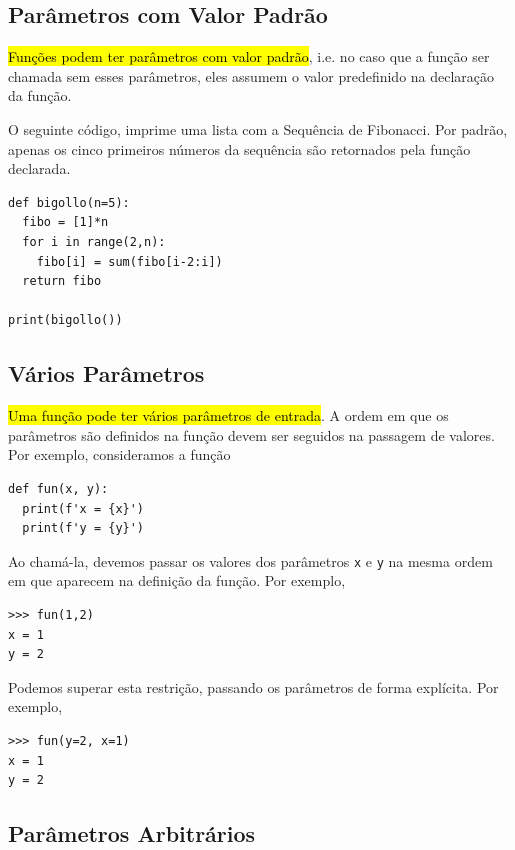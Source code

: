 \subsection{Parâmetros com Valor Padrão}

\hl{Funções podem ter parâmetros com valor padrão}, i.e. no caso que a função ser chamada sem esses parâmetros, eles assumem o valor predefinido na declaração da função.

\begin{ex}
  O seguinte código, imprime uma lista com a Sequência de Fibonacci{\fibonacci}. Por padrão, apenas os cinco primeiros números da sequência são retornados pela função declarada.

\begin{lstlisting}
def bigollo(n=5):
  fibo = [1]*n
  for i in range(2,n):
    fibo[i] = sum(fibo[i-2:i])
  return fibo

print(bigollo())
\end{lstlisting}

\end{ex}

\subsection{Vários Parâmetros}

\hl{Uma função pode ter vários parâmetros de entrada}. A ordem em que os parâmetros são definidos na função devem ser seguidos na passagem de valores. Por exemplo, consideramos a função

\begin{lstlisting}
def fun(x, y):
  print(f'x = {x}')
  print(f'y = {y}')
\end{lstlisting}

Ao chamá-la, devemos passar os valores dos parâmetros \lstinline+x+ e \lstinline+y+ na mesma ordem em que aparecem na definição da função. Por exemplo,

\begin{lstlisting}
>>> fun(1,2)
x = 1
y = 2
\end{lstlisting}

Podemos superar esta restrição, passando os parâmetros de forma explícita. Por exemplo,

\begin{lstlisting}
>>> fun(y=2, x=1)
x = 1
y = 2
\end{lstlisting}

\subsection{Parâmetros Arbitrários}

